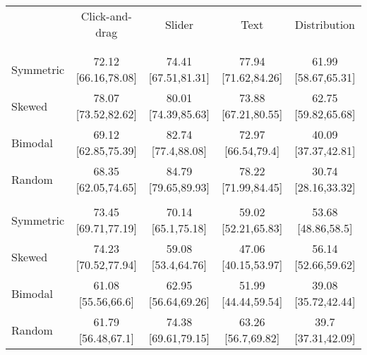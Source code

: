 
\begin{tabular}[t]{lcccc}
\toprule
\multicolumn{1}{c}{ } & \multicolumn{1}{c}{Click-and-drag} & \multicolumn{1}{c}{Slider} & \multicolumn{1}{c}{Text} & \multicolumn{1}{c}{Distribution} \\
\cmidrule(l{3pt}r{3pt}){2-2} \cmidrule(l{3pt}r{3pt}){3-3} \cmidrule(l{3pt}r{3pt}){4-4} \cmidrule(l{3pt}r{3pt}){5-5}
\addlinespace[0.3em]
\multicolumn{5}{l}{\textbf{45 seconds}}\\
\addlinespace[0.3em]
\multicolumn{5}{l}{\textbf{7 bins}}\\
\hspace{1em}\hspace{1em}Symmetric & 72.12 [66.16,78.08] & 74.41 [67.51,81.31] & 77.94 [71.62,84.26] & 61.99 [58.67,65.31]\\
\hspace{1em}\hspace{1em}Skewed & 78.07 [73.52,82.62] & 80.01 [74.39,85.63] & 73.88 [67.21,80.55] & 62.75 [59.82,65.68]\\
\hspace{1em}\hspace{1em}Bimodal & 69.12 [62.85,75.39] & 82.74 [77.4,88.08] & 72.97 [66.54,79.4] & 40.09 [37.37,42.81]\\
\hspace{1em}\hspace{1em}Random & 68.35 [62.05,74.65] & 84.79 [79.65,89.93] & 78.22 [71.99,84.45] & 30.74 [28.16,33.32]\\
\addlinespace[0.3em]
\multicolumn{5}{l}{\textbf{15 bins}}\\
\hspace{1em}\hspace{1em}Symmetric & 73.45 [69.71,77.19] & 70.14 [65.1,75.18] & 59.02 [52.21,65.83] & 53.68 [48.86,58.5]\\
\hspace{1em}\hspace{1em}Skewed & 74.23 [70.52,77.94] & 59.08 [53.4,64.76] & 47.06 [40.15,53.97] & 56.14 [52.66,59.62]\\
\hspace{1em}\hspace{1em}Bimodal & 61.08 [55.56,66.6] & 62.95 [56.64,69.26] & 51.99 [44.44,59.54] & 39.08 [35.72,42.44]\\
\hspace{1em}\hspace{1em}Random & 61.79 [56.48,67.1] & 74.38 [69.61,79.15] & 63.26 [56.7,69.82] & 39.7 [37.31,42.09]\\

\end{tabular}
